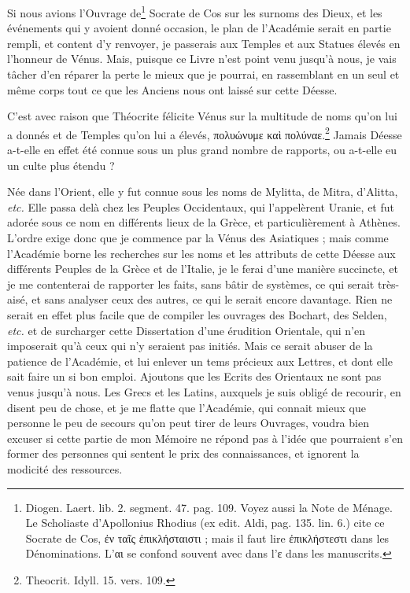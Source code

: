 \documentclass[a4paper, 11pt, oneside, polutonikogreek, french]{article}
\begin{document}
Si nous avions l'Ouvrage de\footnote{Diogen. Laert. lib. 2. segment. 47. pag. 109. Voyez aussi la Note de Ménage. Le Scholiaste d'Apollonius Rhodius (ex edit. Aldi, pag. 135. lin. 6.) cite ce Socrate de Cos, ἐν ταῖς ἐπικλήσταιστι ; mais il faut lire ἐπικλήστεστι dans les Dénominations. L'αι se confond souvent avec dans l'ε dans les manuscrits.} Socrate de Cos sur les surnoms des Dieux, et les événements qui y avoient donné occasion, le plan de l'Académie serait en partie rempli, et content d'y renvoyer, je passerais aux Temples et aux Statues élevés en l'honneur de Vénus. Mais, puisque ce Livre n'est point venu jusqu'à nous, je vais tâcher d'en réparer la perte le mieux que je pourrai, en rassemblant en un seul et même corps tout ce que les Anciens nous ont laissé sur cette Déesse.

C'est avec raison que Théocrite félicite Vénus sur la multitude de noms qu'on lui a donnés et de Temples qu'on lui a élevés, πολυώνυμε καὶ πολύναε.\footnote{Theocrit. Idyll. 15. vers. 109.} Jamais Déesse a-t-elle en effet été connue sous un plus grand nombre de rapports, ou a-t-elle eu un culte plus étendu ?

Née dans l'Orient, elle y fut connue sous les noms de Mylitta, de Mitra, d'Alitta, \emph{etc.} Elle passa delà chez les Peuples Occidentaux, qui l'appelèrent Uranie, et fut adorée sous ce nom en différents lieux de la Grèce, et particulièrement à Athènes. L'ordre exige donc que je commence par la Vénus des Asiatiques ; mais comme l'Académie borne les recherches sur les noms et les attributs de cette Déesse aux différents Peuples de la Grèce et de l'Italie, je le ferai d'une manière succincte, et je me contenterai de rapporter les faits, sans bâtir de systèmes, ce qui serait très-aisé, et sans analyser ceux des autres, ce qui le serait encore davantage. Rien ne serait en effet plus facile que de compiler les ouvrages des Bochart, des Selden, \emph{etc.} et de surcharger cette Dissertation d'une érudition Orientale, qui n'en imposerait qu'à ceux qui n'y seraient pas initiés. Mais ce serait abuser de la patience de l'Académie, et lui enlever un tems précieux aux Lettres, et dont elle sait faire un si bon emploi. Ajoutons que les Ecrits des Orientaux ne sont pas venus jusqu'à nous. Les Grecs et les Latins, auxquels je suis obligé de recourir, en disent peu de chose, et je me flatte que l'Académie, qui connait mieux que personne le peu de secours qu'on peut tirer de leurs Ouvrages, voudra bien excuser si cette partie de mon Mémoire ne répond pas à l'idée que pourraient s'en former des personnes qui sentent le prix des connaissances, et ignorent la modicité des ressources.
\end{document}
